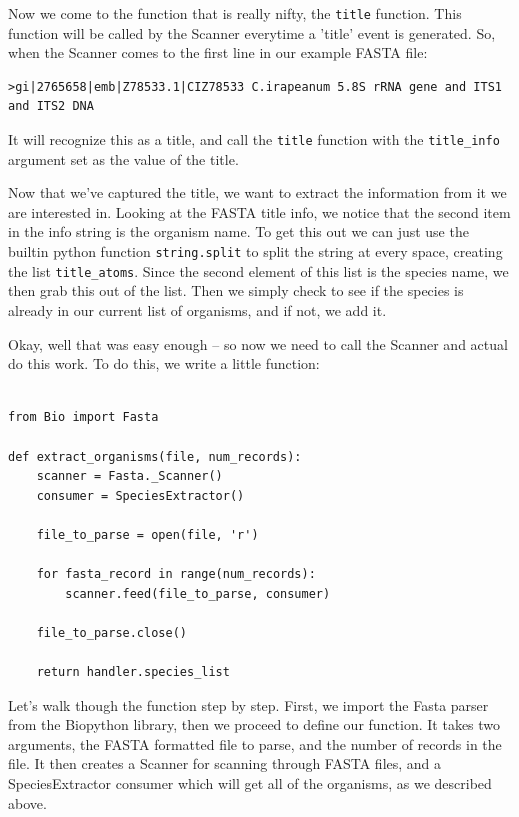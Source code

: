 \documentclass{report}
\begin{document}
Now we come to the function that is really nifty, the \verb|title| function. This function will be called by the Scanner everytime a 'title' event is generated. So, when the Scanner comes to the first line in our example FASTA file:

\begin{verbatim}
>gi|2765658|emb|Z78533.1|CIZ78533 C.irapeanum 5.8S rRNA gene and ITS1 and ITS2 DNA
\end{verbatim}

It will recognize this as a title, and call the \verb|title| function with the \verb|title_info| argument set as the value of the title.


Now that we've captured the title, we want to extract the information from it we are interested in. Looking at the FASTA title info, we notice that the second item in the info string is the organism name. To get this out we can just use the builtin python function \verb|string.split| to split the string at every space, creating the list \verb|title_atoms|. Since the second element of this list is the species name, we then grab this out of the list. Then we simply check to see if the species is already in our current list of organisms, and if not, we add it.


Okay, well that was easy enough -- so now we need to call the Scanner and actual do this work. To do this, we write a little function:

\begin{verbatim}

from Bio import Fasta

def extract_organisms(file, num_records):
    scanner = Fasta._Scanner()
    consumer = SpeciesExtractor()

    file_to_parse = open(file, 'r')

    for fasta_record in range(num_records):
        scanner.feed(file_to_parse, consumer)

    file_to_parse.close()

    return handler.species_list

\end{verbatim}

Let's walk though the function step by step. First, we import the Fasta parser from the Biopython library, then we proceed to define our function. It takes two arguments, the FASTA formatted file to parse, and the number of records in the file. It then creates a Scanner for scanning through FASTA files, and a SpeciesExtractor consumer which will get all of the organisms, as we described above.
\end{document}
